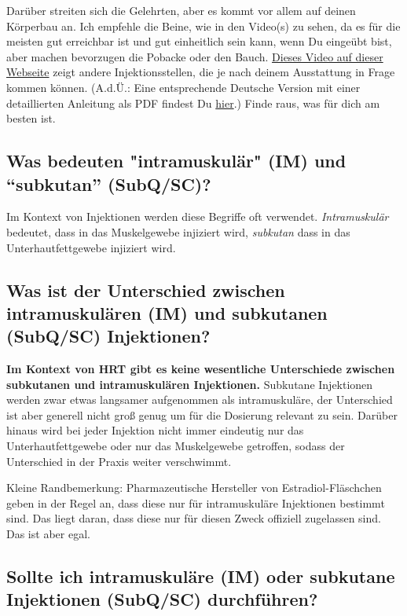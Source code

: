 \documentclass{article}
\begin{document}
{Darüber streiten sich die Gelehrten, aber es kommt vor allem auf deinen Körperbau an. Ich empfehle die Beine, wie in den Video(s) zu sehen, da es für die meisten gut erreichbar ist und gut einheitlich sein kann, wenn Du eingeübt bist, aber machen bevorzugen die Pobacke oder den Bauch. \href{https://vertisis.com/articles/how-to-self-administer-a-subcutaneous-injection}{Dieses Video auf dieser Webseite} zeigt andere Injektionsstellen, die je nach deinem Ausstattung in Frage kommen können. (A.d.Ü.: Eine entsprechende Deutsche Version mit einer detaillierten Anleitung als PDF findest Du \href{https://www.bk-trier.de/media-bkt/docs/PIZ_HZ_Subkutane_Injektion_2021.pdf}{hier}.) Finde raus, was für dich am besten ist.

\subsection{Was bedeuten "intramuskulär" (IM) und “subkutan” (SubQ/SC)?}

Im Kontext von Injektionen werden diese Begriffe oft verwendet. \textit{Intramuskulär} bedeutet, dass in das Muskelgewebe injiziert wird, \textit{subkutan} dass in das Unterhautfettgewebe injiziert wird.

\subsection{Was ist der Unterschied zwischen intramuskulären (IM) und subkutanen (SubQ/SC) Injektionen?}

\textbf{Im Kontext von HRT gibt es keine wesentliche Unterschiede zwischen subkutanen und intramuskulären Injektionen.} Subkutane Injektionen werden zwar etwas langsamer aufgenommen als intramuskuläre, der Unterschied ist aber generell nicht groß genug um für die Dosierung relevant zu sein. Darüber hinaus wird bei jeder Injektion nicht immer eindeutig nur das Unterhautfettgewebe oder nur das Muskelgewebe getroffen, sodass der Unterschied in der Praxis weiter verschwimmt.

Kleine Randbemerkung: Pharmazeutische Hersteller von Estradiol-Fläschchen geben in der Regel an, dass diese nur für intramuskuläre Injektionen bestimmt sind. Das liegt daran, dass diese nur für diesen Zweck offiziell zugelassen sind. Das ist aber egal.

\subsection{Sollte ich intramuskuläre (IM) oder subkutane Injektionen (SubQ/SC) durchführen?}

}
\end{document}
